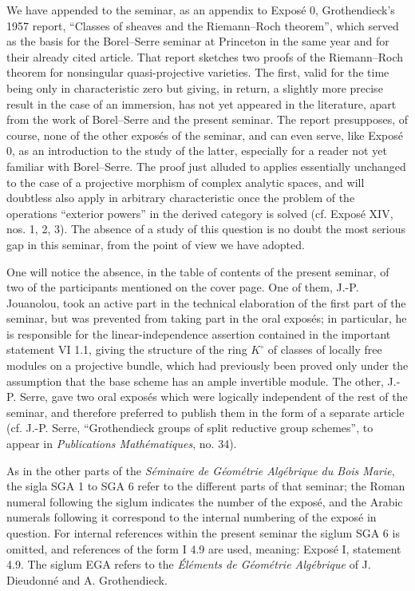 \documentclass[11pt]{article}
\begin{document}
We have appended to the seminar, as an appendix to Exposé 0, Grothendieck's 1957 report, ``Classes of sheaves and the Riemann--Roch theorem'', which served as the basis for the Borel--Serre seminar at Princeton in the same year and for their already cited article. That report sketches two proofs of the Riemann--Roch theorem for nonsingular quasi-projective varieties. The first, valid for the time being only in characteristic zero but giving, in return, a slightly more precise result in the case of an immersion, has not yet appeared in the literature, apart from the work of Borel--Serre and the present seminar. The report presupposes, of course, none of the other exposés of the seminar, and can even serve, like Exposé 0, as an introduction to the study of the latter, especially for a reader not yet familiar with Borel--Serre. The proof just alluded to applies essentially unchanged to the case of a projective morphism of complex analytic spaces, and will doubtless also apply in arbitrary characteristic once the problem of the operations ``exterior powers'' in the derived category is solved (cf. Exposé XIV, nos. 1, 2, 3). The absence of a study of this question is no doubt the most serious gap in this seminar, from the point of view we have adopted.

One will notice the absence, in the table of contents of the present seminar, of two of the participants mentioned on the cover page. One of them, J.-P. Jouanolou, took an active part in the technical elaboration of the first part of the seminar, but was prevented from taking part in the oral exposés; in particular, he is responsible for the linear-independence assertion contained in the important statement VI 1.1, giving the structure of the ring $K^\circ$ of classes of locally free modules on a projective bundle, which had previously been proved only under the assumption that the base scheme has an ample invertible module. The other, J.-P. Serre, gave two oral exposés which were logically independent of the rest of the seminar, and therefore preferred to publish them in the form of a separate article (cf. J.-P. Serre, ``Grothendieck groups of split reductive group schemes'', to appear in \emph{Publications Mathématiques}, no. 34).

As in the other parts of the \emph{Séminaire de Géométrie Algébrique du Bois Marie}, the sigla SGA 1 to SGA 6 refer to the different parts of that seminar; the Roman numeral following the siglum indicates the number of the exposé, and the Arabic numerals following it correspond to the internal numbering of the exposé in question. For internal references within the present seminar the siglum SGA 6 is omitted, and references of the form I 4.9 are used, meaning: Exposé I, statement 4.9. The siglum EGA refers to the \emph{Éléments de Géométrie Algébrique} of J. Dieudonné and A. Grothendieck.
\end{document}
